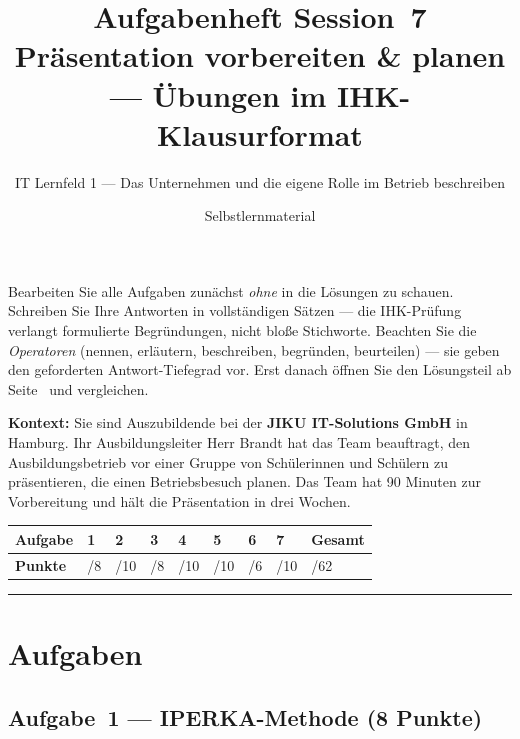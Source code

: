 \documentclass[11pt, a4paper]{article}
\title{\vspace*{-1.5cm}\Huge\bfseries\color{bfwPrimaryDark}Aufgabenheft Session~7\\[0.4em]
  \large\color{bfwInkSoft}\textnormal{Präsentation vorbereiten \& planen --- Übungen im IHK-Klausurformat}}
\author{\textsf{IT Lernfeld 1 --- Das Unternehmen und die eigene Rolle im Betrieb beschreiben}}
\date{Selbstlernmaterial}
\begin{document}
\maketitle
\thispagestyle{empty}

\begin{merksatz}[title={\bfseries So nutzen Sie dieses Aufgabenheft}]
Bearbeiten Sie alle Aufgaben zunächst \emph{ohne} in die Lösungen zu schauen. Schreiben
Sie Ihre Antworten in vollständigen Sätzen --- die IHK-Prüfung verlangt formulierte
Begründungen, nicht bloße Stichworte. Beachten Sie die \emph{Operatoren} (nennen,
erläutern, beschreiben, begründen, beurteilen) --- sie geben den geforderten
Antwort-Tiefegrad vor. Erst danach öffnen Sie den Lösungsteil ab Seite~\pageref{loesungen}
und vergleichen.
\end{merksatz}

\bigskip

\textbf{Kontext:} Sie sind Auszubildende bei der \textbf{JIKU IT-Solutions GmbH} in Hamburg.
Ihr Ausbildungsleiter Herr Brandt hat das Team beauftragt, den Ausbildungsbetrieb vor einer
Gruppe von Schülerinnen und Schülern zu präsentieren, die einen Betriebsbesuch planen.
Das Team hat 90 Minuten zur Vorbereitung und hält die Präsentation in drei Wochen.

\bigskip

\noindent
\begin{tabular}{|l|l|l|l|l|l|l|l|l|}
\hline
\textbf{Aufgabe} & 1 & 2 & 3 & 4 & 5 & 6 & 7 & \textbf{Gesamt}\\
\hline
\textbf{Punkte} & /8 & /10 & /8 & /10 & /10 & /6 & /10 & /62\\
\hline
\end{tabular}

\tableofcontents
\vspace{1em}
\hrule

\section{Aufgaben}

\subsection*{Aufgabe~1 --- IPERKA-Methode (8 Punkte)}
\end{document}
